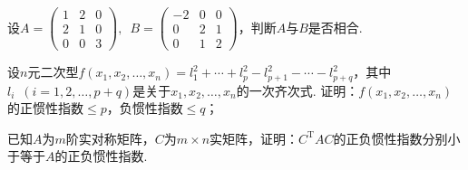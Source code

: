 \begin{summary}

\end{summary}

\begin{exercise}

    \begin{exgroup}
        \item 设$A=\begin{pmatrix}
            1 & 2 & 0 \\ 2 & 1 & 0 \\ 0 & 0 & 3
        \end{pmatrix},\enspace B=\begin{pmatrix}
            -2 & 0 & 0 \\ 0 & 2 & 1 \\ 0 & 1 & 2
        \end{pmatrix}$，判断$A$与$B$是否相合.
    \end{exgroup}

    \begin{exgroup}
        \item 设$n$元二次型$f(x_1,x_2,\ldots,x_n)=l_1^2+\cdots+l_p^2-l_{p+1}^2-\cdots-l_{p+q}^2$，其中$l_i\enspace (i=1,2,\ldots,p+q)$是关于$x_1,x_2,\ldots,x_n$的一次齐次式. 证明：$f(x_1,x_2,\ldots,x_n)$的正惯性指数$\leqslant p$，负惯性指数$\leqslant q$；

        \item 已知$A$为$m$阶实对称矩阵，$C$为$m\times n$实矩阵，证明：$C^\mathrm{T}AC$的正负惯性指数分别小于等于$A$的正负惯性指数.
    \end{exgroup}

    \begin{exgroup}
        \item
    \end{exgroup}
\end{exercise}
